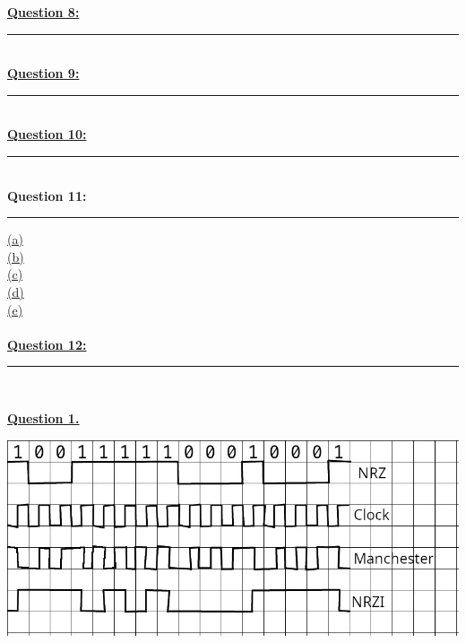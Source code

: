 \documentclass[12pt]{article}
\begin{document}
\hyperlink{8}{\textbf{Question 8:}}
\vspace{1mm}
\hrule
~\\

\hyperlink{9}{\textbf{Question 9:}}
\vspace{1mm}
\hrule
~\\

\hyperlink{10}{\textbf{Question 10:}}
\vspace{1mm}
\hrule
~\\

{\textbf{Question 11:}}
\vspace{1mm}
\hrule
\vspace{1mm}
\hyperlink{11.1}{(a)}\\
\hyperlink{11.2}{(b)}\\
\hyperlink{11.3}{(c)}\\
\hyperlink{11.4}{(d)}\\
\hyperlink{11.5}{(e)}\\
\\

\hyperlink{12}{\textbf{Question 12:}}
\vspace{1mm}
\hrule
~\\

\newpage

\hyperlink{toc}{\hypertarget{1}{\LARGE \underline{\textbf{Question 1.}}}}\\
\begin{center}
	\includegraphics[width=\textwidth]{cscd58-a2-q1.jpg}
\end{center}
\newpage
\end{document}
